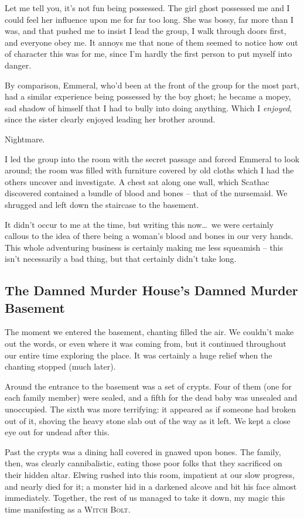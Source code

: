 Let me tell you, it's not fun being possessed. The girl ghost possessed me and I could feel her influence upon me for far too long. She was bossy, far more than I was, and that pushed me to insist I lead the group, I walk through doors first, and everyone obey me. It annoys me that none of them seemed to notice how out of character this was for me, since I'm hardly the first person to put myself into danger.

By comparison, Emmeral, who'd been at the front of the group for the most part, had a similar experience being possessed by the boy ghost; he became a mopey, sad shadow of himself that I had to bully into doing anything. Which I \emph{enjoyed}, since the sister clearly enjoyed leading her brother around.

Nightmare.

I led the group into the room with the secret passage and forced Emmeral to look around; the room was filled with furniture covered by old cloths which I had the others uncover and investigate. A chest sat along one wall, which Scathac discovered contained a bundle of blood and bones -- that of the nursemaid. We shrugged and left down the staircase to the basement.

It didn't occur to me at the time, but writing this now\dots\ we were certainly callous to the idea of there being a woman's blood and bones in our very hands. This whole adventuring business is certainly making me less squeamish -- this isn't necessarily a bad thing, but that certainly didn't take long.

\subsection*{The Damned Murder House's Damned Murder Basement}
The moment we entered the basement, chanting filled the air. We couldn't make out the words, or even where it was coming from, but it continued throughout our entire time exploring the place. It was certainly a huge relief when the chanting stopped (much later).

Around the entrance to the basement was a set of crypts. Four of them (one for each family member) were sealed, and a fifth for the dead baby was unsealed and unoccupied. The sixth was more terrifying: it appeared as if someone had broken out of it, shoving the heavy stone slab out of the way as it left. We kept a close eye out for undead after this.

Past the crypts was a dining hall covered in gnawed upon bones. The family, then, was clearly cannibalistic, eating those poor folks that they sacrificed on their hidden altar. Elwing rushed into this room, impatient at our slow progress, and nearly died for it; a monster hid in a darkened alcove and bit his face almost immediately. Together, the rest of us managed to take it down, my magic this time manifesting as a \textsc{Witch Bolt}.

